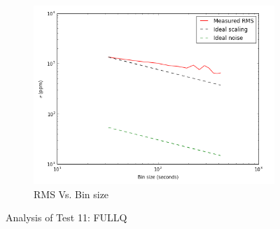 \documentclass[conference]{IEEEtran}
\begin{document}
\begin{figure}[H]
    \begin{subfigure}{3}
        \includegraphics[scale=0.6]{rms_test11}
        \caption{RMS Vs. Bin size}
    \end{subfigure}
    \caption{Analysis of Test 11: FULLQ}
\end{figure}
\end{document}
